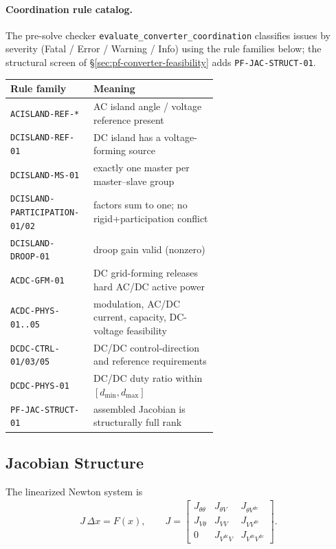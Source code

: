 \paragraph{Coordination rule catalog.}
The pre-solve checker \texttt{evaluate\_converter\_coordination} classifies
issues by severity (Fatal / Error / Warning / Info) using the rule families
below; the structural screen of \S\ref{sec:pf-converter-feasibility} adds
\texttt{PF-JAC-STRUCT-01}.
\begin{center}
\small
\begin{tabular}{l p{0.60\linewidth}}
\toprule
Rule family & Meaning \\
\midrule
\texttt{ACISLAND-REF-*} & AC island angle / voltage reference present \\
\texttt{DCISLAND-REF-01} & DC island has a voltage-forming source \\
\texttt{DCISLAND-MS-01} & exactly one master per master--slave group \\
\texttt{DCISLAND-PARTICIPATION-01/02} & factors sum to one; no rigid+participation conflict \\
\texttt{DCISLAND-DROOP-01} & droop gain valid (nonzero) \\
\texttt{ACDC-GFM-01} & DC grid-forming releases hard AC/DC active power \\
\texttt{ACDC-PHYS-01..05} & modulation, AC/DC current, capacity, DC-voltage feasibility \\
\texttt{DCDC-CTRL-01/03/05} & DC/DC control-direction and reference requirements \\
\texttt{DCDC-PHYS-01} & DC/DC duty ratio within \([d_{\min},d_{\max}]\) \\
\texttt{PF-JAC-STRUCT-01} & assembled Jacobian is structurally full rank \\
\bottomrule
\end{tabular}
\end{center}

\subsection{Jacobian Structure}

The linearized Newton system is
\begin{align}
J\,\Delta x = F(x),
\qquad
J =
\begin{bmatrix}
J_{\theta\theta} & J_{\theta V} & J_{\theta V^{dc}} \\
J_{V\theta} & J_{VV} & J_{V V^{dc}} \\
0 & J_{V^{dc} V} & J_{V^{dc} V^{dc}}
\end{bmatrix}.
\end{align}

